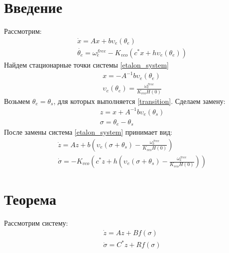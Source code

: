 \documentclass[a4paper]{article}
\begin{document}

\section{Введение}
Рассмотрим:
 \begin{equation}\label{etalon_system}
 \begin{aligned}
 &\dot{x} = Ax + b\upsilon_e(\theta_e)\\
 &\dot{\theta_e} = \omega_e^{free} - K_{vco}(c^*x + h\upsilon_e(\theta_e))
 \end{aligned}
\end{equation}
Найдем стационарные точки системы \ref{etalon_system}
 \begin{equation}\label{transition}
 \begin{aligned}
 &x = -A^{-1}b\upsilon_e(\theta_e)\\
 &\upsilon_e(\theta_e) = \frac{\omega_e^{free}}{K_{vco}H(0)}
 \end{aligned}
\end{equation}
Возьмем $\theta_e = \theta_s$, для которых выполняется \ref{transition}. Сделаем замену:
 \begin{equation}\label{replacement1}
 \begin{aligned}
 &z =x + A^{-1}b\upsilon_e(\theta_s)\\
 &\sigma = \theta_e - \theta_s
 \end{aligned}
\end{equation}
После замены система \ref{etalon_system} принимает вид:
 \begin{equation}\label{etalon_system}
 \begin{aligned}
 &\dot{z} = Az + b(\upsilon_e(\sigma + \theta_s) - \frac{\omega_e^{free}}{K_{vco}H(0)})\\
 &\dot{\sigma} = -K_{vco}(c^*z + h(\upsilon_e(\sigma + \theta_s) - \frac{\omega_e^{free}}{K_{vco}H(0)}))
 \end{aligned}
\end{equation}

\section{Теорема}
Рассмотрим систему:
 \begin{equation}\label{system}
 \begin{aligned}
 &\dot{z} = Az + Bf(\sigma)\\
 &\dot{\sigma} = C^*z + Rf(\sigma)
 \end{aligned}
\end{equation}
\end{document}
